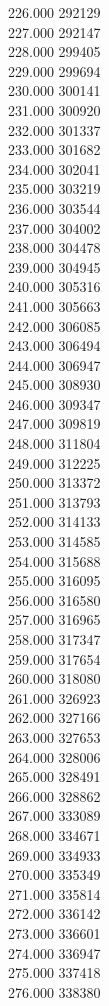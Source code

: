 { 226.000	292129 \\
 227.000	292147 \\
 228.000	299405 \\
 229.000	299694 \\
 230.000	300141 \\
 231.000	300920 \\
 232.000	301337 \\
 233.000	301682 \\
 234.000	302041 \\
 235.000	303219 \\
 236.000	303544 \\
 237.000	304002 \\
 238.000	304478 \\
 239.000	304945 \\
 240.000	305316 \\
 241.000	305663 \\
 242.000	306085 \\
 243.000	306494 \\
 244.000	306947 \\
 245.000	308930 \\
 246.000	309347 \\
 247.000	309819 \\
 248.000	311804 \\
 249.000	312225 \\
 250.000	313372 \\
 251.000	313793 \\
 252.000	314133 \\
 253.000	314585 \\
 254.000	315688 \\
 255.000	316095 \\
 256.000	316580 \\
 257.000	316965 \\
 258.000	317347 \\
 259.000	317654 \\
 260.000	318080 \\
 261.000	326923 \\
 262.000	327166 \\
 263.000	327653 \\
 264.000	328006 \\
 265.000	328491 \\
 266.000	328862 \\
 267.000	333089 \\
 268.000	334671 \\
 269.000	334933 \\
 270.000	335349 \\
 271.000	335814 \\
 272.000	336142 \\
 273.000	336601 \\
 274.000	336947 \\
 275.000	337418 \\
 276.000	338380 \\
}
